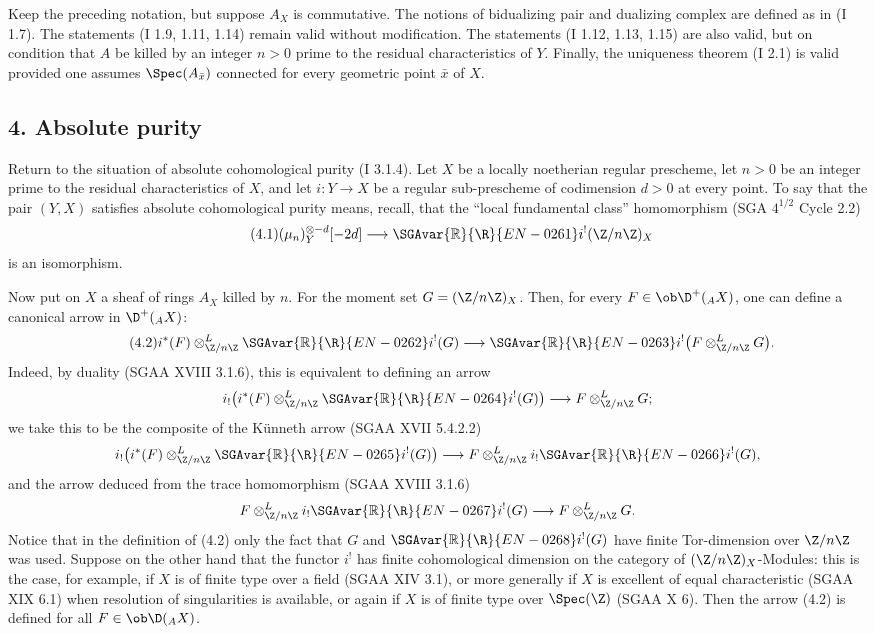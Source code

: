 Keep the preceding notation, but suppose $A_X$ is commutative. The notions of bidualizing pair and dualizing complex are defined as in (I 1.7). The statements (I 1.9, 1.11, 1.14) remain valid without modification. The statements (I 1.12, 1.13, 1.15) are also valid, but on condition that $A$ be killed by an integer $n>0$ prime to the residual characteristics of $Y$. Finally, the uniqueness theorem (I 2.1) is valid provided one assumes $\Spec(A_{\bar{x}})$ connected for every geometric point $\bar{x}$ of $X$.

\subsection*{4. Absolute purity}

Return to the situation of absolute cohomological purity (I 3.1.4). Let $X$ be a locally noetherian regular prescheme, let $n>0$ be an integer prime to the residual characteristics of $X$, and let $i:Y\to X$ be a regular sub-prescheme of codimension $d>0$ at every point. To say that the pair $(Y,X)$ satisfies absolute cohomological purity means, recall, that the ``local fundamental class'' homomorphism (SGA $4^{1/2}$ Cycle 2.2)
\begin{equation}\tag{4.1}
        (\mu_n)_Y^{\otimes -d}[-2d]\longrightarrow \SGAvar{\mathbb{R}}{\R}{EN-0261} i^!(\Z/n\Z)_X
\end{equation}
is an isomorphism.

Now put on $X$ a sheaf of rings $A_X$ killed by $n$. For the moment set $G=(\Z/n\Z)_X$. Then, for every $F\in\ob\D^+({}_A X)$, one can define a canonical arrow in $\D^+({}_A X)$:
\begin{equation}\tag{4.2}
        i^*(F)\otimes^L_{\Z/n\Z} \SGAvar{\mathbb{R}}{\R}{EN-0262} i^!(G)\longrightarrow \SGAvar{\mathbb{R}}{\R}{EN-0263} i^!\bigl(F\otimes^L_{\Z/n\Z}G\bigr).
\end{equation}
Indeed, by duality (SGAA XVIII 3.1.6), this is equivalent to defining an arrow
\[
        i_!\bigl(i^*(F)\otimes^L_{\Z/n\Z}\SGAvar{\mathbb{R}}{\R}{EN-0264} i^!(G)\bigr)\longrightarrow F\otimes^L_{\Z/n\Z}G;
\]
we take this to be the composite of the Künneth arrow (SGAA XVII 5.4.2.2)
\[
        i_!\bigl(i^*(F)\otimes^L_{\Z/n\Z}\SGAvar{\mathbb{R}}{\R}{EN-0265} i^!(G)\bigr)\longrightarrow F\otimes^L_{\Z/n\Z}i_!\SGAvar{\mathbb{R}}{\R}{EN-0266} i^!(G),
\]
and the arrow deduced from the trace homomorphism (SGAA XVIII 3.1.6)
\[
        F\otimes^L_{\Z/n\Z}i_!\SGAvar{\mathbb{R}}{\R}{EN-0267} i^!(G)\longrightarrow F\otimes^L_{\Z/n\Z}G.
\]
Notice that in the definition of (4.2) only the fact that $G$ and $\SGAvar{\mathbb{R}}{\R}{EN-0268} i^!(G)$ have finite Tor-dimension over $\Z/n\Z$ was used. Suppose on the other hand that the functor $i^!$ has finite cohomological dimension on the category of $(\Z/n\Z)_X$-Modules: this is the case, for example, if $X$ is of finite type over a field (SGAA XIV 3.1), or more generally if $X$ is excellent of equal characteristic (SGAA XIX 6.1) when resolution of singularities is available, or again if $X$ is of finite type over $\Spec(\Z)$ (SGAA X 6). Then the arrow (4.2) is defined for all $F\in\ob\D({}_A X)$.

